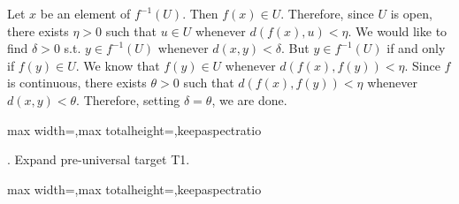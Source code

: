 \documentclass[a4paper,twoside,12pt]{article}
\makeatletter
\DeclareRobustCommand{\_}{%
  \leavevmode\vbox{%
    \hrule\@width.4em
          \@height-.16ex
          \@depth\dimexpr.16ex+.28pt\relax}}
\newcommand\Tstrut{\rule{0pt}{2.4ex}}
\newcommand\Bstrut{\rule[-1.1ex]{0pt}{0pt}}
\newenvironment{fit}{\begin{adjustbox}{max width=\textwidth,max totalheight=\textheight,keepaspectratio}}{\end{adjustbox}}
\makeatother
\begin{document}
\begin{center}
\begin{minipage}{120mm}
Let $x$ be an element of $f^{-1}(U)$. Then $f(x)\in U$. Therefore, since $U$ is open, there exists $\eta > 0$ such that $u\in U$\textrm{ whenever }$\textit{d}(f(x),u) < \eta$. We would like to find $\delta > 0$ s.t. $y\in f^{-1}(U)$\textrm{ whenever }$\textit{d}(x,y) < \delta$. But $y\in f^{-1}(U)$ if and only if $f(y)\in U$. We know that $f(y)\in U$ whenever $\textit{d}(f(x),f(y)) < \eta$. Since $f$ is continuous, there exists $\theta > 0$ such that $\textit{d}(f(x),f(y)) < \eta$ whenever $\textit{d}(x,y) < \theta$. Therefore, setting $\delta = \theta$, we are done.
\end{minipage}
\end{center}

\bigskip
\begin{steps}
\begin{fit}%
\end{fit}
\smallskip

. Expand pre-universal target T1.\nopagebreak[4] 
\marginpar{}\nopagebreak[4] 
\smallskip\nopagebreak[4] 

\begin{fit}%
\end{fit}
\smallskip


\end{steps}
\end{document}
